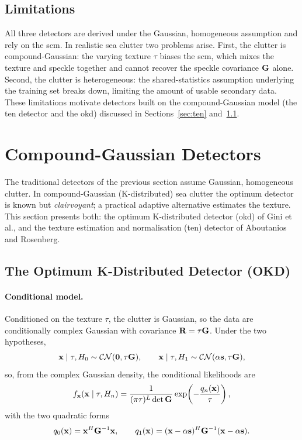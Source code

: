 \documentclass{article}
\begin{document}
\subsection{Limitations}
All three detectors are derived under the Gaussian, homogeneous assumption and rely on the \gls{scm}. In realistic sea clutter two problems arise. First, the clutter is compound-Gaussian: the varying texture $\tau$ biases the \gls{scm}, which mixes the texture and speckle together and cannot recover the speckle covariance $\mathbf{G}$ alone. Second, the clutter is heterogeneous: the shared-statistics assumption underlying the training set breaks down, limiting the amount of usable secondary data. These limitations motivate detectors built on the compound-Gaussian model (the \gls{ten} detector and the \gls{okd}) discussed in Sections~\ref{sec:ten} and~\ref{sec:okd}.

\newpage
\section{Compound-Gaussian Detectors}
The traditional detectors of the previous section assume Gaussian, homogeneous clutter. In compound-Gaussian (K-distributed) sea clutter the optimum detector is known but \emph{clairvoyant}; a practical adaptive alternative estimates the texture. This section presents both: the optimum K-distributed detector (\gls{okd}) of Gini et al., and the texture estimation and normalisation (\gls{ten}) detector of Aboutanios and Rosenberg.

\subsection{The Optimum K-Distributed Detector (OKD)}
\label{sec:okd}
\paragraph{Conditional model.}
Conditioned on the texture $\tau$, the clutter is Gaussian, so the data are conditionally complex Gaussian with covariance $\mathbf{R}=\tau\mathbf{G}$. Under the two hypotheses,
$$\vb x\mid\tau,H_0 \sim\mathcal{CN}(\vb 0,\tau\mathbf{G}), \qquad
  \vb x\mid\tau,H_1 \sim\mathcal{CN}(\alpha\vb s,\tau\mathbf{G}),$$
so, from the complex Gaussian density, the conditional likelihoods are
$$f_{\vb x}(\vb x\mid\tau,H_n)=\frac{1}{(\pi\tau)^L\det\mathbf{G}}
   \exp\!\left(-\frac{q_n(\vb x)}{\tau}\right),$$
with the two quadratic forms
$$q_0(\vb x)=\vb x^H\mathbf{G}^{-1}\vb x, \qquad
  q_1(\vb x)=(\vb x-\alpha\vb s)^H\mathbf{G}^{-1}(\vb x-\alpha\vb s).$$
\end{document}
